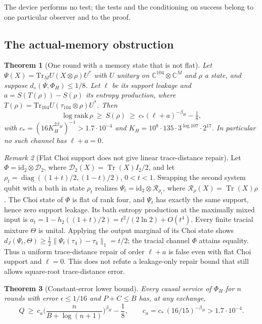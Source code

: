 \documentclass[11pt,a4paper]{article}
\theoremstyle{plain}
\newtheorem{theorem}{Theorem}[section]
\theoremstyle{definition}
\theoremstyle{remark}
\newtheorem{remark}[theorem]{Remark}
\DeclareMathOperator{\Tr}{Tr}
\DeclareMathOperator{\diag}{diag}
\newcommand{\dJ}{d_J}
\newcommand{\ddia}{d_\diamond}
\begin{document}
The device performs no test; the tests and the conditioning on success belong to one particular observer and to the
proof.



\subsection{The actual-memory obstruction}\label{sec:constant}


\begin{theorem}[One round with a memory state that is not flat]\label{thm:one-round}
Let $\Psi(X)=\mathrm{Tr}_MU(X\otimes\rho)U^*$ with $U$ unitary on $\mathbb C^{104}\otimes\mathbb C^M$ and $\rho$ a state, and suppose
$\ddia(\Psi,\Phi_H)\le1/8$. Let $\ell$ be its support leakage and $a=S(T(\rho))-S(\rho)$ its entropy production, where
$T(\rho)=\mathrm{Tr}_{104}U(\tau_{104}\otimes\rho)U^*$. Then
\[
\log\mathrm{rank}\,\rho\ \ge\ S(\rho)\ \ge\ c_*(\ell+a)^{-\beta_H}-\tfrac18,
\]
with $c_*=(16K_H^{2\beta_H})^{-1}>1.7\cdot10^{-4}$ and $K_H=10^8\cdot135\cdot3^{\log107}\cdot2^{17}$. In particular no such channel has
$\ell+a=0$.
\end{theorem}

\begin{remark}[Flat Choi support does not give linear trace-distance repair]\label{rem:flat-repair}
Let $\Phi=\mathrm{id}_2\otimes\mathcal D_2$, where $\mathcal D_2(X)=\Tr(X)I_2/2$, and let
$\rho_t=\diag((1+t)/2,(1-t)/2)$, $0<t<1$. Swapping the second system qubit with a bath in state $\rho_t$ realizes
$\Psi_t=\mathrm{id}_2\otimes\mathcal R_{\rho_t}$, where $\mathcal R_\rho(X)=\Tr(X)\rho$.
The Choi state of $\Phi$ is flat of rank four, and $\Psi_t$ has exactly the same support, hence zero support leakage.
Its bath entropy production at the maximally mixed input is
$a_t=1-h_2((1+t)/2)=t^2/(2\ln2)+O(t^4)$.
Every finite tracial mixture $\Theta$ is unital. Applying the output marginal of its Choi state shows
$\dJ(\Psi_t,\Theta)\ge\tfrac12\|\Psi_t(\tau_4)-\tau_4\|_1=t/2$;
the tracial channel $\Phi$ attains equality. Thus a uniform trace-distance repair of order $\ell+a$ is false even with flat Choi support and
$\ell=0$. This does not refute a leakage-only repair bound that still allows square-root trace-distance error.
\end{remark}

\begin{theorem}[Constant-error lower bound]\label{thm:constant-lower}
Every causal service of $\Phi_H$ for $n$ rounds with error $\epsilon\le1/16$ and $P+C\le B$ has, at any exchange,
\[
Q\ \ge\ c_a\Big(\frac{n}{B+\log(n+1)}\Big)^{\beta_H}-\frac18,\qquad c_a=c_*\,(16/15)^{-\beta_H}>1.7\cdot10^{-4}.
\]
\end{theorem}
\end{document}
